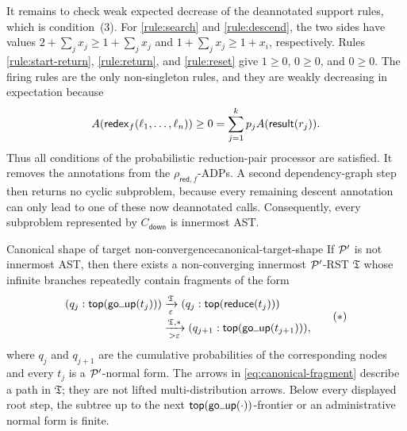 It remains to check weak expected decrease of the deannotated support rules,
which is condition~(3).  For \eqref{rule:search} and \eqref{rule:descend}, the
two sides have values \(2+\sum_jx_j\geq1+\sum_jx_j\) and
\(1+\sum_jx_j\geq1+x_i\), respectively.  Rules
\eqref{rule:start-return}, \eqref{rule:return}, and \eqref{rule:reset} give
\(1\geq0\), \(0\geq0\), and \(0\geq0\).  The firing rules are the only
non-singleton rules, and they are weakly decreasing in expectation because
\[
  A(\tredex_f(\ell_1,\ldots,\ell_n))
    \geq 0
    =\sum_{j=1}^{k}p_j A(\tresult(r_j)).
\]
Thus all conditions of the probabilistic reduction-pair processor are
satisfied.  It removes the annotations from the
\(\rho_{\mathsf{red},f}\)-ADPs.  A second dependency-graph step then returns no
cyclic subproblem, because every remaining descent annotation can only lead to
one of these now deannotated calls.  Consequently, every subproblem represented
by \(C_{\mathsf{down}}\) is innermost AST.

\begin{Lemma}{Canonical shape of target non-convergence}{canonical-target-shape}
  If \(\P'\) is not innermost AST, then there exists a non-converging
  innermost \(\P'\)-RST \(\mathfrak T\) whose infinite branches repeatedly
  contain fragments of the form
  \[
    \begin{aligned}
      (q_j:\ttop(\tgoup(t_j)))
      &\xrightarrow[\varepsilon]{\mathfrak T}
       (q_j:\ttop(\treduce(t_j)))\\[-1pt]
      &\xrightarrow[>\varepsilon]{\mathfrak T,*}
       (q_{j+1}:\ttop(\tgoup(t_{j+1}))),
    \end{aligned}
    \tag{\(*\)}\label{eq:canonical-fragment}
  \]
  where \(q_j\) and \(q_{j+1}\) are the cumulative probabilities of the
  corresponding nodes and every \(t_j\) is a \(\P'\)-normal form.  The arrows
  in \eqref{eq:canonical-fragment} describe a path in \(\mathfrak T\); they are
  not lifted multi-distribution arrows.  Below every displayed root step, the subtree
  up to the next \(\ttop(\tgoup(\cdot))\)-frontier or an administrative normal
  form is finite.
\end{Lemma}

